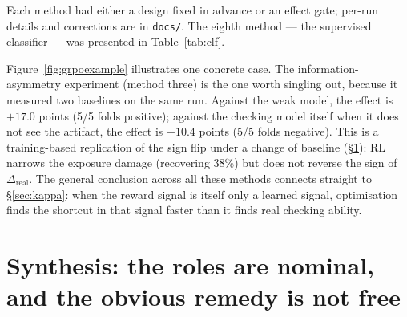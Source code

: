 \documentclass[11pt,a4paper]{article}
\newcommand{\dhonest}{\Delta_{\mathrm{real}}}
\begin{document}
Each method had either a design fixed in advance or an effect gate; per-run details and
corrections are in \texttt{docs/}. The eighth method --- the supervised classifier
--- was presented in Table~\ref{tab:clf}.

Figure~\ref{fig:grpoexample} illustrates one concrete case. The information-asymmetry experiment (method three) is the one worth singling out, because it measured two baselines on the same run. Against the weak model, the effect is $+17.0$ points (5/5 folds positive); against the checking model itself when it does not see the artifact, the effect is $-10.4$ points (5/5 folds negative). This is a training-based replication of the sign flip under a change of baseline (\S\ref{sec:synthesis}): RL narrows the exposure damage (recovering 38\%) but does not reverse the sign of $\dhonest$. The general conclusion across all these methods connects straight to \S\ref{sec:kappa}: when the reward signal is itself only a learned signal, optimisation finds the shortcut in that signal faster than it finds real checking ability.
\section{Synthesis: the roles are nominal, and the obvious remedy is not free}\label{sec:synthesis}
\end{document}
